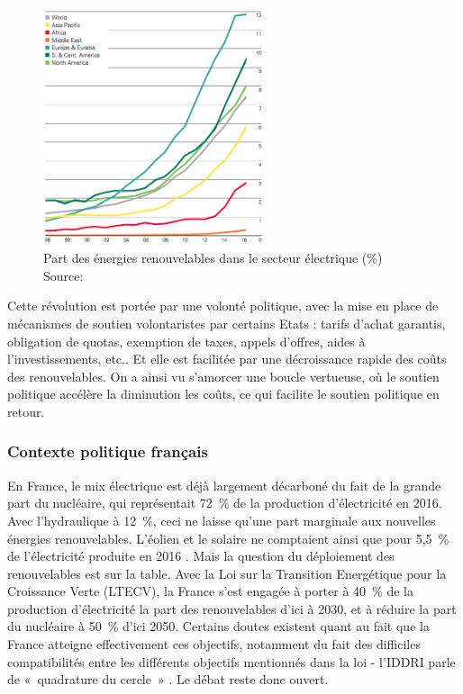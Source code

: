 \begin{figure}[!ht]
	\centering
	\includegraphics[height=7cm]{figures/BP_ENR_Expansion.png}
	\caption[Part des énergies renouvelables dans le secteur électrique (\%)]{Part des énergies renouvelables dans le secteur électrique (\%)\\Source: \citet[p. 43]{BP2017}}
\end{figure}

Cette révolution est portée par une volonté politique, avec la mise en place de mécanismes de soutien volontaristes par certains Etats : tarifs d’achat garantis, obligation de quotas, exemption de taxes, appels d’offres, aides à l’investissements, etc.\citep{EuropeanCommission2013}. Et elle est facilitée par une décroissance rapide des coûts des renouvelables. On a ainsi vu s’amorcer une boucle vertueuse, où le soutien politique accélère la diminution les coûts, ce qui facilite le soutien politique en retour.

\subsubsection{Contexte politique français}
En France, le mix électrique est déjà largement décarboné du fait de la grande part du nucléaire, qui représentait 72~\% de la production d’électricité en 2016. Avec l’hydraulique à 12~\%, ceci ne laisse qu’une part marginale aux nouvelles énergies renouvelables. L’éolien et le solaire ne comptaient ainsi que pour 5,5~\% de l'électricité produite en 2016 \citep{RTE2016}. 
Mais la question du déploiement des renouvelables est sur la table. Avec la Loi sur la Transition Energétique pour la Croissance Verte (LTECV), la France s’est engagée à porter à 40~\% de la production d’électricité la part des renouvelables d’ici à 2030, et à réduire la part du nucléaire à 50~\% d’ici 2050. Certains doutes existent quant au fait que la France atteigne effectivement ces objectifs, notamment du fait des difficiles compatibilités entre les différents objectifs mentionnés dans la loi - l’IDDRI parle de «~quadrature du cercle~» \citep{Rudinger2017}. Le débat reste donc ouvert.

